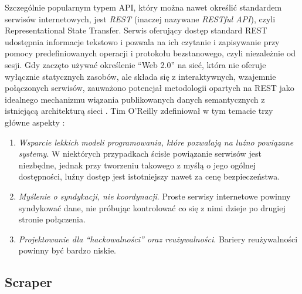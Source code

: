 Szczególnie popularnym typem API, który można nawet określić standardem serwisów internetowych, jest \emph{REST} (inaczej nazywane \emph{RESTful API}), czyli Representational State Transfer.
Serwis oferujący dostęp standard REST udostępnia informacje tekstowo i pozwala na ich czytanie i zapisywanie przy pomocy predefiniowanych operacji i protokołu bezstanowego, czyli niezależnie od sesji.
Gdy zaczęto używać określenie ``Web 2.0'' na sieć, która nie oferuje wyłącznie statycznych zasobów, ale składa się z interaktywnych, wzajemnie połączonych serwisów, zauważono potencjał metodologii opartych na REST jako idealnego mechanizmu wiązania publikowanych danych semantycznych z istniejącą architekturą sieci \cite{battle2008bridging}.
Tim O'Reilly zdefiniował w tym temacie trzy główne aspekty \cite{o2009web}:
\begin{enumerate}
	\item \emph{Wsparcie lekkich modeli programowania, które pozwalają na luźno powiązane systemy}.
	W niektórych przypadkach ścisłe powiązanie serwisów jest niezbędne, jednak przy tworzeniu takowego z myślą o jego ogólnej dostępności, luźny dostęp jest istotniejszy nawet za cenę bezpieczeństwa.
	\item \emph{Myślenie o syndykacji\footnotemark, nie koordynacji}.
	Proste serwisy internetowe powinny syndykować dane, nie próbując kontrolować co się z nimi dzieje po drugiej stronie połączenia.
	\item \emph{Projektowanie dla ``hackowalności'' oraz reużywalności}.
	Bariery reużywalności powinny być bardzo niskie.
\end{enumerate}

\subsection{Scraper}

